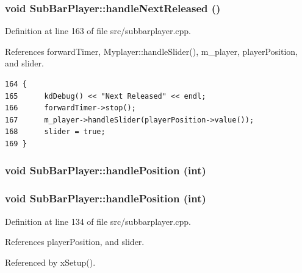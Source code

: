 \subsubsection{\setlength{\rightskip}{0pt plus 5cm}void Sub\-Bar\-Player::handle\-Next\-Released ()\hspace{0.3cm}{\tt  [slot]}}\label{classSubBarPlayer_SubBarPlayeri5}




Definition at line 163 of file src/subbarplayer.cpp.

References forward\-Timer, Myplayer::handle\-Slider(), m\_\-player, player\-Position, and slider.



\footnotesize\begin{verbatim}164 {
165      kdDebug() << "Next Released" << endl;
166      forwardTimer->stop();
167      m_player->handleSlider(playerPosition->value());
168      slider = true;
169 }
\end{verbatim}\normalsize 
{}
\subsubsection{\setlength{\rightskip}{0pt plus 5cm}void Sub\-Bar\-Player::handle\-Position (int)\hspace{0.3cm}{\tt  [slot]}}\label{classSubBarPlayer_SubBarPlayeri18}


\subsubsection{\setlength{\rightskip}{0pt plus 5cm}void Sub\-Bar\-Player::handle\-Position (int)\hspace{0.3cm}{\tt  [slot]}}\label{classSubBarPlayer_SubBarPlayeri0}




Definition at line 134 of file src/subbarplayer.cpp.

References player\-Position, and slider.

Referenced by x\-Setup().



